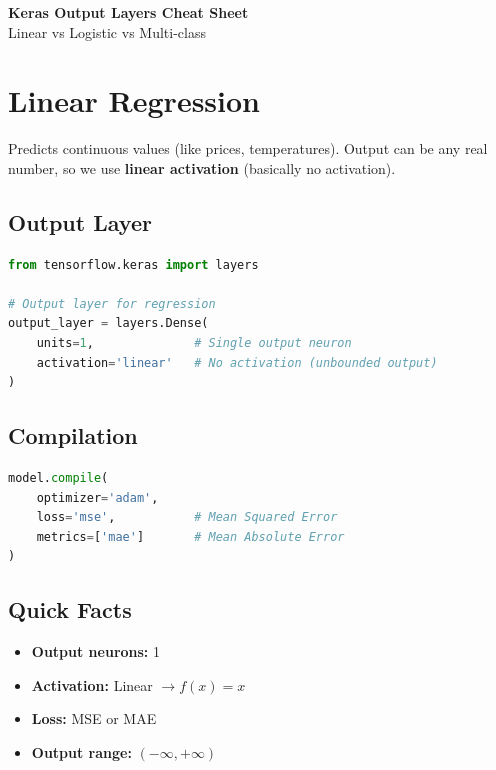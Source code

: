 \documentclass[12pt,a4paper]{article}
\begin{document}
\begin{center}
{\LARGE \textbf{Keras Output Layers Cheat Sheet}}\\[0.3em]
{\large Linear vs Logistic vs Multi-class}
\end{center}

\vspace{0.5cm}


\section{Linear Regression}

Predicts continuous values (like prices, temperatures). Output can be any real number, so we use \textbf{linear activation} (basically no activation).

\subsection{Output Layer}

\begin{lstlisting}[language=Python, caption=Linear Regression Output Layer]
from tensorflow.keras import layers

# Output layer for regression
output_layer = layers.Dense(
    units=1,              # Single output neuron
    activation='linear'   # No activation (unbounded output)
)
\end{lstlisting}

\subsection{Compilation}

\begin{lstlisting}[language=Python, caption=Compiling for Regression]
model.compile(
    optimizer='adam',
    loss='mse',           # Mean Squared Error
    metrics=['mae']       # Mean Absolute Error
)
\end{lstlisting}

\subsection{Quick Facts}

\begin{itemize}
    \item \textbf{Output neurons:} 1
    \item \textbf{Activation:} Linear $\rightarrow f(x) = x$
    \item \textbf{Loss:} MSE or MAE
    \item \textbf{Output range:} $(-\infty, +\infty)$
\end{itemize}
\end{document}
